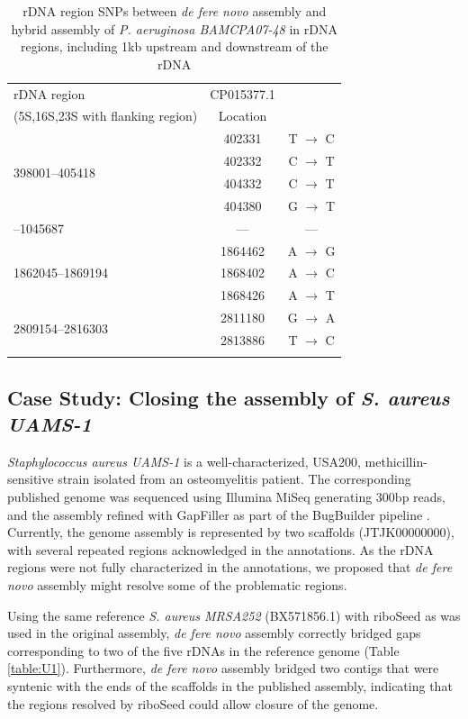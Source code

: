 \documentclass[10pt]{article}
\begin{document}
\begin{linenumbers}
\begin{table}[!h]
\centering
\caption{rDNA region SNPs between \textit{de fere novo} assembly and hybrid assembly of \textit{P. aeruginosa BAMCPA07-48} in rDNA regions, including 1kb upstream and downstream of the rDNA}
\label{table:snps}
\begin{tabular}{lcc}
  \toprule
  rDNA region & CP015377.1  &     \\
  (5S,16S,23S with flanking region) & Location &     \\
  \midrule
  \multirow{4}{*}{398001--405418}  & 402331     & T $\to$ C \\
              & 402332     & C $\to$ T \\
              & 404332     & C $\to$ T \\
              & 404380     & G $\to$ T \\
  \arrayrulecolor{lgray}\hline
  1039539--1045687 &  ---          &  ---   \\
  \hline
  \multirow{3}{*}{1862045--1869194} & 1864462    & A $\to$ G \\
              & 1868402    & A $\to$ C \\
              & 1868426    & A $\to$ T \\
  \hline
  \multirow{2}{*}{2809154--2816303} & 2811180    & G $\to$ A \\
              & 2813886    & T $\to$ C \\
  \arrayrulecolor{black}
  \bottomrule
\end{tabular}
\end{table}


\subsection*{Case Study: Closing the assembly of \textit{S. aureus UAMS-1}}
\textit{Staphylococcus aureus UAMS-1} is a well-characterized, USA200, methicillin-sensitive strain isolated from an osteomyelitis patient. The corresponding published genome was sequenced using Illumina MiSeq generating 300bp reads, and the assembly refined with GapFiller as part of the BugBuilder pipeline \cite{Abbott2017}. Currently, the genome assembly is represented by two scaffolds (JTJK00000000), with several repeated regions acknowledged in the annotations\cite{Sassi2015}. As the rDNA regions were not fully characterized in the annotations, we proposed that \textit{de fere novo} assembly might resolve some of the problematic regions.

Using the same reference \textit{S. aureus MRSA252}\cite{Holden2004} (BX571856.1) with riboSeed as was used in the original assembly, \textit{de fere novo} assembly correctly bridged gaps corresponding to two of the five rDNAs in the reference genome (Table \ref{table:U1}). Furthermore, \textit{de fere novo} assembly bridged two contigs that were syntenic with the ends of the scaffolds in the published assembly, indicating that the regions resolved by riboSeed could allow closure of the genome.



\end{linenumbers}
\end{document}
